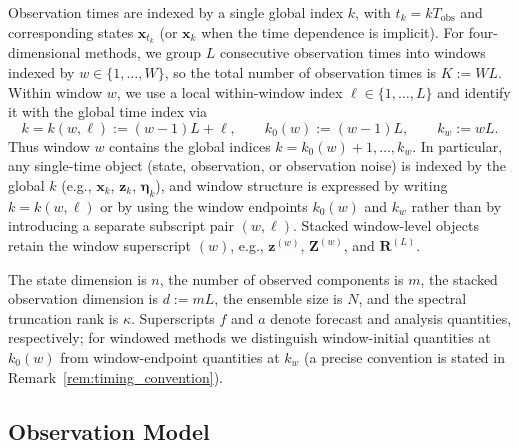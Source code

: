 \documentclass[11pt,a4paper]{article}
\begin{document}
Observation times are indexed by a single global index $k$, with $t_k=kT_{\mathrm{obs}}$ and corresponding states $\mathbf{x}_{t_k}$ (or $\mathbf{x}_k$ when the time dependence is implicit). For four-dimensional methods, we group $L$ consecutive observation times into windows indexed by $w\in\{1,\ldots,W\}$, so the total number of observation times is $K:=WL$. Within window $w$, we use a local within-window index $\ell\in\{1,\ldots,L\}$ and identify it with the global time index via
\begin{equation}
k=k(w,\ell):=(w-1)L+\ell,
\qquad
k_0(w):=(w-1)L,
\qquad
k_w:=wL.
\label{eq:k_w_ell_mapping}
\end{equation}
Thus window $w$ contains the global indices $k=k_0(w)+1,\ldots,k_w$. In particular, any single-time object (state, observation, or observation noise) is indexed by the global $k$ (e.g., $\mathbf{x}_k$, $\mathbf{z}_k$, $\boldsymbol{\eta}_k$), and window structure is expressed by writing $k=k(w,\ell)$ or by using the window endpoints $k_0(w)$ and $k_w$ rather than by introducing a separate subscript pair $(w,\ell)$. Stacked window-level objects retain the window superscript $(w)$, e.g., $\mathbf{z}^{(w)}$, $\mathbf{Z}^{(w)}$, and $\mathbf{R}^{(L)}$.

The state dimension is $n$, the number of observed components is $m$, the stacked observation dimension is $d:=mL$, the ensemble size is $N$, and the spectral truncation rank is $\kappa$. Superscripts $f$ and $a$ denote forecast and analysis quantities, respectively; for windowed methods we distinguish window-initial quantities at $k_0(w)$ from window-endpoint quantities at $k_w$ (a precise convention is stated in Remark~\ref{rem:timing_convention}).



\subsection{Observation Model}
\label{subsec:obs_problem}
\end{document}
